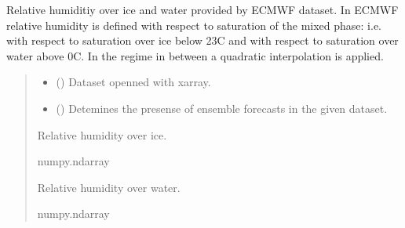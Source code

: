 \documentclass[a4paper,11pt,english]{sphinxmanual}
\begin{document}
\begin{fulllineitems}
\label{\detokenize{modules:envlib.contrail.get_relative_hum}}
\pysigstartsignatures
{}
\pysigstopsignatures
\sphinxAtStartPar
Relative humiditiy over ice and water provided by ECMWF dataset. In ECMWF relative humidity is defined with respect 
to saturation of the mixed phase: i.e. with respect to saturation over ice below \sphinxhyphen{}23C and with respect to saturation over water above 0C. 
In the regime in between a quadratic interpolation is applied.
\begin{quote}\begin{description}
\begin{itemize}
\item {} 
\sphinxAtStartPar
{} () \textendash{} Dataset openned with xarray.

\item {} 
\sphinxAtStartPar
{} () \textendash{} Detemines the presense of ensemble forecasts in the given dataset.

\end{itemize}

\sphinxAtStartPar
Relative humidity over ice.

\sphinxAtStartPar
numpy.ndarray

\sphinxAtStartPar
Relative humidity over water.

\sphinxAtStartPar
numpy.ndarray

\end{description}\end{quote}

\end{fulllineitems}

\end{document}
